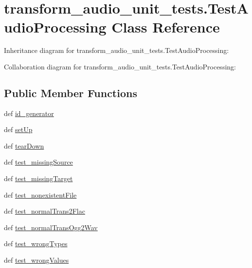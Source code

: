 \hypertarget{classtransform__audio__unit__tests_1_1TestAudioProcessing}{\section{transform\-\_\-audio\-\_\-unit\-\_\-tests.\-Test\-Audio\-Processing Class Reference}
\label{classtransform__audio__unit__tests_1_1TestAudioProcessing}
}


Inheritance diagram for transform\-\_\-audio\-\_\-unit\-\_\-tests.\-Test\-Audio\-Processing\-:


Collaboration diagram for transform\-\_\-audio\-\_\-unit\-\_\-tests.\-Test\-Audio\-Processing\-:
\subsection*{Public Member Functions}
\begin{DoxyCompactItemize}
\item 
def \hyperlink{classtransform__audio__unit__tests_1_1TestAudioProcessing_a44cdd2f28c01d3d3e92b13833286c04b}{id\-\_\-generator}
\item 
def \hyperlink{classtransform__audio__unit__tests_1_1TestAudioProcessing_a37987b2d4dade71f23e6b2dbb344db25}{set\-Up}
\item 
def \hyperlink{classtransform__audio__unit__tests_1_1TestAudioProcessing_a7759b1fb95cb6f25a73373ba03f0e33e}{tear\-Down}
\item 
def \hyperlink{classtransform__audio__unit__tests_1_1TestAudioProcessing_a99b32b0c2dfa5642c4392ff3aa552b79}{test\-\_\-missing\-Source}
\item 
def \hyperlink{classtransform__audio__unit__tests_1_1TestAudioProcessing_a142b46138ed651dbe67b719fa3253c9c}{test\-\_\-missing\-Target}
\item 
def \hyperlink{classtransform__audio__unit__tests_1_1TestAudioProcessing_ac7154e9b8466da4f0d522c198d2e173d}{test\-\_\-nonexistent\-File}
\item 
def \hyperlink{classtransform__audio__unit__tests_1_1TestAudioProcessing_a0c191b29541490d9914e279804c9e157}{test\-\_\-normal\-Trans2\-Flac}
\item 
def \hyperlink{classtransform__audio__unit__tests_1_1TestAudioProcessing_a7053a3b5740d8f633384bdfb00cc6b7c}{test\-\_\-normal\-Trans\-Ogg2\-Wav}
\item 
def \hyperlink{classtransform__audio__unit__tests_1_1TestAudioProcessing_ac38a482686c1bb26e8947fd7720f1ba4}{test\-\_\-wrong\-Types}
\item 
def \hyperlink{classtransform__audio__unit__tests_1_1TestAudioProcessing_af79a01b2a97e81caf73811059d2212de}{test\-\_\-wrong\-Values}
\end{DoxyCompactItemize}
